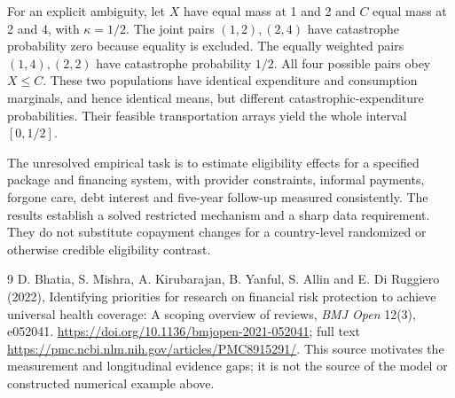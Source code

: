 \documentclass[11pt]{article}
\theoremstyle{remark}\newtheorem{remark}[theorem]{Remark}
\begin{document}
For an explicit ambiguity, let $X$ have equal mass at 1 and 2 and $C$ equal mass at 2 and 4, with $\kappa=1/2$. The joint pairs $(1,2),(2,4)$ have catastrophe probability zero because equality is excluded. The equally weighted pairs $(1,4),(2,2)$ have catastrophe probability $1/2$. All four possible pairs obey $X\le C$. These two populations have identical expenditure and consumption marginals, and hence identical means, but different catastrophic-expenditure probabilities. Their feasible transportation arrays yield the whole interval $[0,1/2]$.

The unresolved empirical task is to estimate eligibility effects for a specified package and financing system, with provider constraints, informal payments, forgone care, debt interest and five-year follow-up measured consistently. The results establish a solved restricted mechanism and a sharp data requirement. They do not substitute copayment changes for a country-level randomized or otherwise credible eligibility contrast.

\begin{thebibliography}{9}
 D. Bhatia, S. Mishra, A. Kirubarajan, B. Yanful, S. Allin and E. Di Ruggiero (2022), Identifying priorities for research on financial risk protection to achieve universal health coverage: A scoping overview of reviews, \emph{BMJ Open} 12(3), e052041. \url{https://doi.org/10.1136/bmjopen-2021-052041}; full text \url{https://pmc.ncbi.nlm.nih.gov/articles/PMC8915291/}. This source motivates the measurement and longitudinal evidence gaps; it is not the source of the model or constructed numerical example above.
\end{thebibliography}
\end{document}
